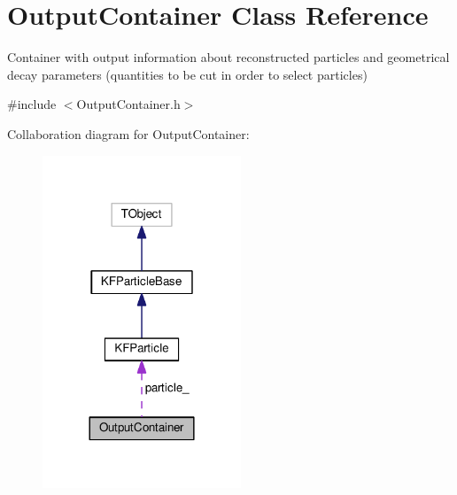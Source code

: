 \hypertarget{classOutputContainer}{}\section{Output\+Container Class Reference}
\label{classOutputContainer}


Container with output information about reconstructed particles and geometrical decay parameters (quantities to be cut in order to select particles)  




{\ttfamily \#include $<$Output\+Container.\+h$>$}



Collaboration diagram for Output\+Container\+:\nopagebreak
\begin{figure}[H]
\begin{center}
\leavevmode
\includegraphics[width=168pt]{classOutputContainer__coll__graph}
\end{center}
\end{figure}
